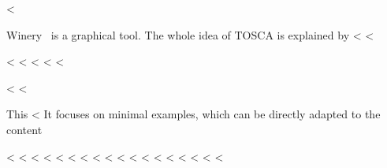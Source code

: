 \documentclass[runningheads,a4paper,english]{llncs}[2018/03/10]
\begin{document}
{<%
\label{sec:relatedwork}

Winery~\cite{Winery} is a graphical  tool.
The whole idea of TOSCA is explained by <%
<%

<%
<%
<%
\label{sec:latexhints}
<%
\label{chap:latexhints}
<%

<%
\newcount\LTGbeginlineexample
\newcount\LTGendlineexample
\newenvironment{ltgexample}%
{\LTGbeginlineexample=\numexpr\inputlineno+1\relax}%
{%
\LTGendlineexample=\numexpr\inputlineno-1\relax%

\tcbinputlisting{%
  listing only,
  listing file=\currfilepath,
  colback=green!5!white,
  colframe=green!25,
  coltitle=black!90,
  coltext=black!90,
  left=8mm,
  title=Corresponding \LaTeX{} code of \texttt{\currfilepath},
<%
  listing options={%
    frame=none,
    language={[LaTeX]TeX},
    escapeinside={},
    firstline=\the\LTGbeginlineexample,
    lastline=\the\LTGendlineexample,
    firstnumber=\the\LTGbeginlineexample,
    basewidth=.5em,
    aboveskip=0mm,
    belowskip=0mm,
    numbers=left,
    xleftmargin=0mm,
    numberstyle=\tiny,
    numbersep=8pt%
  }
<%
    minted language=TeX,
    minted style=vs,
    minted options={
      fontsize=\footnotesize,
      firstline=\the\LTGbeginlineexample,
      lastline=\the\LTGendlineexample,
      firstnumber=\the\LTGbeginlineexample,
      breaklines,
      linenos,
      numbersep=8pt
    }
<%
}
}%
<%

This <%
It focuses on minimal examples, which can be directly adapted to the content

<%
<%
<%
<%
<%
<%
<%
<%
<%
<%
<%
<%
<%
<%
<%
<%
<%
<%

}
\end{document}

